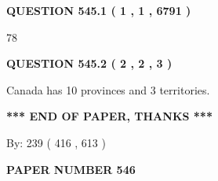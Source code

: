 \documentclass[12pt]{article}
\begin{document}
   
   
   
 \vspace{0.2in}
 
 
 
 
   
   
  
\vspace{0.2in}
  
{\textbf{\Large{QUESTION
545.1 
 ( 1 , 1 , 6791 )
}}}
  
  
 
 
\noindent{}

78
 
 
  
\vspace{0.2in}
  
{\textbf{\Large{QUESTION
545.2 
 ( 2 , 2 , 3 )
}}}
  
  
 
 
\noindent{}
 
 
Canada has 10  provinces and 3 territories.
 
 
 
 
   
   
 \vspace{0.2in}
 
   
   
   
   
\vspace{1.0in} 
{\textbf{\large{ *** END OF PAPER, THANKS *** }}} 
   
   
\hspace{1.0in} By: 
 239 ( 416 ,  613 )
   
   
   
   
\newpage 
\setcounter{page}{ 
   546001 } 
   
   
   
   
 {\textbf{ \Large{ PAPER NUMBER  546  }}}
   
   
\vspace{0.2in}
   
   
   
   
   
   
 \vspace{0.2in}
 
 
 
 
   
\end{document}
